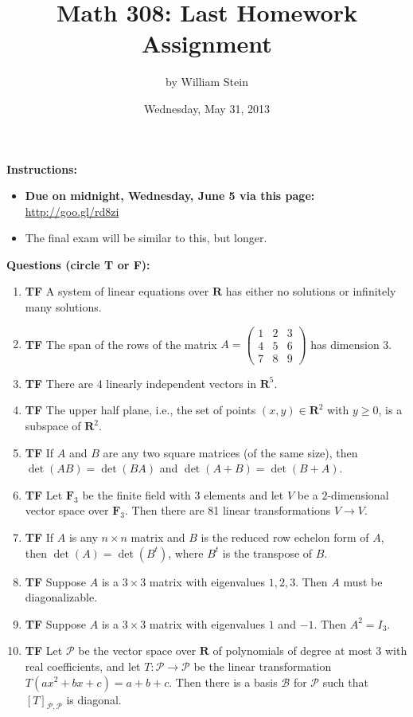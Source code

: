 \documentclass[10pt]{article}
\title{\color{blue}\bf Math 308: Last Homework Assignment}
\date{Wednesday, May 31, 2013}
\author{by William Stein}
\newcommand{\tf}[1]{\item {\bf {\color{blue}\hspace{1em}T\hspace{1em}F}}\hspace{1em} #1}
\newcommand{\R}{\mathbf{R}}
\newcommand{\F}{\mathbf{F}}
\renewcommand{\P}{\mathcal{P}}
\begin{document}
\maketitle
{\noindent\bf\color{red} Instructions:}
\begin{itemize}
\item {\bf Due on midnight, Wednesday, June 5 via this page:} \url{http://goo.gl/rd8zi}
\item The final exam will be similar to this, but longer.
\end{itemize}

{\noindent\bf \color{red} Questions (circle T or F):}
\begin{enumerate}

\tf{A system of linear equations over $\R$ has either no solutions or infinitely many solutions.}

\tf{The span of the rows of the matrix $A=\left(\begin{array}{rrr}
1 & 2 & 3 \\
4 & 5 & 6 \\
7 & 8 & 9
\end{array}\right)$ has dimension 3.}

\tf{There are 4 linearly independent vectors in $\R^5$.}

\tf{The upper half plane, i.e., the set of points $(x,y) \in \R^2$ with $y\geq 0$, is a subspace of $\R^2$.}

\tf{If $A$ and $B$ are any two square matrices (of the same size), then $\det(AB)=\det(BA)$ and $\det(A+B)=\det(B+A)$.}

\tf{Let $\F_3$ be the finite field with $3$ elements and let $V$ be a $2$-dimensional
    vector space over $\F_3$.  Then there are 81 linear transformations $V\to V$.}

\tf{If $A$ is any $n\times n$ matrix and $B$ is the reduced row echelon form of $A$, then $\det(A)=\det(B^t)$, where
$B^t$ is the transpose of $B$.}

\tf{Suppose $A$ is a $3 \times 3$ matrix with eigenvalues $1,2,3$. Then $A$ must be diagonalizable.}

\tf{Suppose $A$ is a $3 \times 3$ matrix with eigenvalues $1$ and $-1$.  Then $A^2=I_3$.}

\tf{Let $\P$ be the vector space over $\R$ of polynomials of degree at most $3$ with real coefficients,
and let $T:\P\to\P$ be the linear transformation $T(ax^2+bx+c)=a+b+c$.  Then there is a basis $\mathcal{B}$
for $\P$ such that $[T]_{\P,\P}$ is diagonal.}


\end{enumerate}
\end{document}

